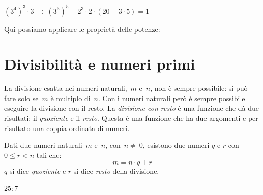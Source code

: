 \begin{esempio}{}{}
\quad \(\left(3^4 \right)^3 \cdot 3^{\dots} \div \left(3^3 \right)^5 -
  2^{3} \cdot 2 \cdot \left( 20 - 3 \cdot 5 \right) = 1\)

Qui possiamo applicare le proprietà delle potenze:

\end{esempio}

\section{Divisibilità e numeri primi}
\label{sec:nat_divsibilita}

La divisione esatta nei numeri naturali,~\(m\) e~\(n\), non è sempre 
possibile: si può fare solo se~\(m\) è multiplo di~\(n\).
Con i numeri naturali però è sempre possibile eseguire la divisione con il 
resto. La \emph{divisione con resto} è una funzione che dà due risultati:
il \emph{quoziente} e il \emph{resto}. 
Questa è una funzione che ha due argomenti e per risultato una coppia 
ordinata di numeri.

\begin{definizione}{}{}
 Dati due numeri naturali~\(m\) e~\(n\), con~\(n\neq~0\), 
 esistono due numeri \(q\) e \(r\) con \(0 \leqslant r < n\) 
 tali che: 
 \[m = n \cdot q + r\] 
 \(q\) si dice \emph{quoziente} e \(r\) si dice \emph{resto} della divisione.
\end{definizione}

\begin{esempio}{}{} \(25:7\)

\end{esempio}

